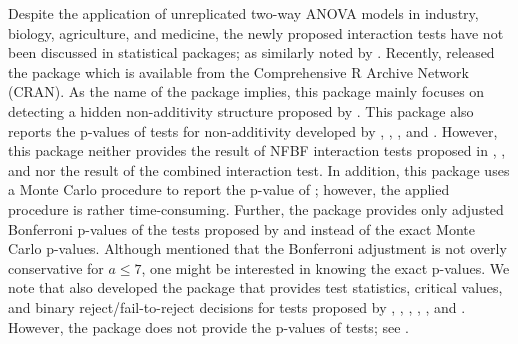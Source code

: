 Despite the application of unreplicated two-way ANOVA models in industry, biology, agriculture, and medicine, the newly proposed interaction tests have not been discussed in statistical packages; as similarly noted by \citet{Franck:2016}. Recently, \citet{Osborne:2016} released the package  which is available from the Comprehensive R Archive Network (CRAN). As the name of the package  implies, this package mainly focuses on detecting a hidden non-additivity structure proposed by \citet{Franck:2013}. This package also reports the p-values of tests for non-additivity developed by \citet{Tukey:1949}, \citet{ Mandel:1961}, \citet{KKSA:2007}, and \citet{Malik:2016}. However, this package neither provides the result of NFBF interaction tests proposed in \citet{Boik:1993}, \citet{Piepho:1994}, and \citet{KKM:2016} nor the result of the combined interaction test. In addition, this package uses a Monte Carlo procedure to report the p-value of \citet{Malik:2016}; however, the applied procedure is rather time-consuming. Further, the package  provides only adjusted Bonferroni p-values of the tests proposed by \citet{KKSA:2007} and \citet{Franck:2013} instead of the exact Monte Carlo p-values. Although \citet{Franck:2016} mentioned that the Bonferroni adjustment is not overly conservative for $a \leq 7$, one might be interested in knowing the exact p-values. We note that \citet{SRS:2014} also developed the  package that provides test statistics, critical values, and binary reject/fail-to-reject decisions for tests proposed by \citet{Tukey:1949}, \citet{Mandel:1961}, \citet{Boik:1993}, \citet{Tusell:1990}, \citet{JG:1972}, and \citet{SS:2013}. However, the  package does not provide the p-values of tests; see \citet{Franck:2016}.


